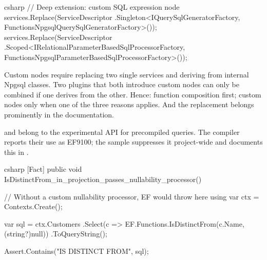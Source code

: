 \begin{sourcecode}{csharp}
// Deep extension: custom SQL expression node
services.Replace(ServiceDescriptor
    .Singleton<IQuerySqlGeneratorFactory, FunctionsNpgsqlQuerySqlGeneratorFactory>());
services.Replace(ServiceDescriptor
    .Scoped<IRelationalParameterBasedSqlProcessorFactory,
        FunctionsNpgsqlParameterBasedSqlProcessorFactory>());
\end{sourcecode}

\begin{important}
  Custom nodes require replacing two single services and deriving from internal Npgsql
  classes. Two plugins that both introduce custom nodes can only be combined if one derives
  from the other. Hence: function composition first; custom nodes only when one of the three
  reasons applies. And the replacement belongs prominently in the documentation.
\end{important}

\begin{note}
   and
   belong
  to the experimental API for precompiled queries. The compiler reports their use as EF9100;
  the sample suppresses it project-wide and documents this in
  .
\end{note}

\begin{sourcecode}{csharp}
[Fact]
public void IsDistinctFrom_in_projection_passes_nullability_processor()
{
    // Without a custom nullability processor, EF would throw here
    using var ctx = Contexts.Create();

    var sql = ctx.Customers
        .Select(c => EF.Functions.IsDistinctFrom(c.Name, (string?)null))
        .ToQueryString();

    Assert.Contains("IS DISTINCT FROM", sql);
}
\end{sourcecode}

